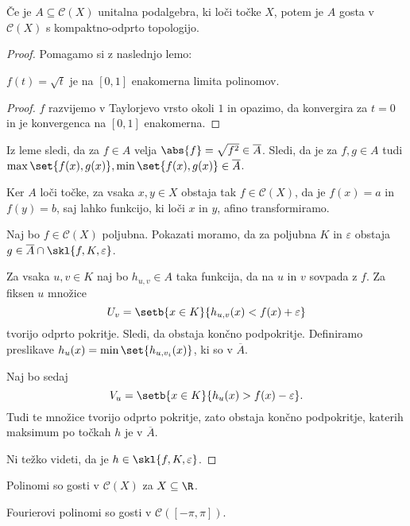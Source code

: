 \begin{izrek}
Če je $A \subseteq \mathcal{C}(X)$ unitalna podalgebra, ki loči
točke $X$, potem je $A$ gosta v $\mathcal{C}(X)$ s kompaktno-odprto
topologijo.
\end{izrek}

\begin{proof}
Pomagamo si z naslednjo lemo:

\begin{lema*}
$f(t) = \sqrt{t}$ je na $[0,1]$ enakomerna limita polinomov.
\end{lema*}

\begin{proof}
$f$ razvijemo v Taylorjevo vrsto okoli $1$ in opazimo, da
konvergira za $t=0$ in je konvergenca na $[0,1]$ enakomerna.
\end{proof}

Iz leme sledi, da za $f \in A$ velja
$\abs{f} = \sqrt{f^2} \in \overline{A}$. Sledi, da je za
$f,g \in A$ tudi
$\max \set{f(x),g(x)}, \min \set{f(x),g(x)} \in \overline{A}$.

Ker $A$ loči točke, za vsaka $x, y \in X$ obstaja tak
$f \in \mathcal{C}(X)$, da je $f(x) = a$ in $f(y) = b$, saj lahko
funkcijo, ki loči $x$ in $y$, afino transformiramo.

Naj bo $f \in \mathcal{C}(X)$ poljubna. Pokazati moramo, da za
poljubna $K$ in $\varepsilon$ obstaja
$g \in \overline{A} \cap \skl{f,K,\varepsilon}$.

Za vsaka $u,v \in K$ naj bo $h_{u,v} \in A$ taka funkcija, da na
$u$ in $v$ sovpada z $f$. Za fiksen $u$ množice
\[
U_v = \setb{x \in K}{h_{u,v}(x) < f(x) + \varepsilon}
\]
tvorijo odprto pokritje. Sledi, da obstaja končno podpokritje.
Definiramo preslikave $h_u(x) = \min \set{h_{u,v_i}(x)}$, ki so v
$\overline{A}$.

Naj bo sedaj
\[
V_u = \setb{x \in K}{h_u(x) > f(x) - \varepsilon}.
\]
Tudi te množice tvorijo odprto pokritje, zato obstaja končno
podpokritje, katerih maksimum po točkah $h$ je v $\overline{A}$.

Ni težko videti, da je $h \in \skl{f,K,\varepsilon}$.
\end{proof}

\begin{posledica}
Polinomi so gosti v $\mathcal{C}(X)$ za $X \subseteq \R$.
\end{posledica}

\begin{posledica}
Fourierovi polinomi so gosti v $\mathcal{C}([-\pi,\pi])$.
\end{posledica}

